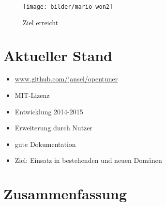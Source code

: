  \begingroup
  \begin{frame}
  
    \begin{figure}
    \centering\texttt{[image: bilder/mario-won2]}
    \caption{Ziel erreicht}
  \end{figure}
  
  \centering{}
  
  \end{frame}  
  \endgroup
  
  \section{Aktueller Stand}
  
    \begin{frame}
      \tableofcontents[currentsection]
    \end{frame}
    

  \begingroup
  \begin{frame}
  
  \begin{itemize}
    \item \url{www.github.com/jansel/opentuner}
    \item MIT-Lizenz
    \item Entwicklung 2014-2015
    \item Erweiterung durch Nutzer
    \item gute Dokumentation
    \item Ziel: Einsatz in bestehenden und neuen Domänen
  \end{itemize}
  
  
  
  \end{frame}  
  \endgroup
    
  \section{Zusammenfassung}
  
    \begin{frame}
      \tableofcontents[currentsection]
    \end{frame}
    
